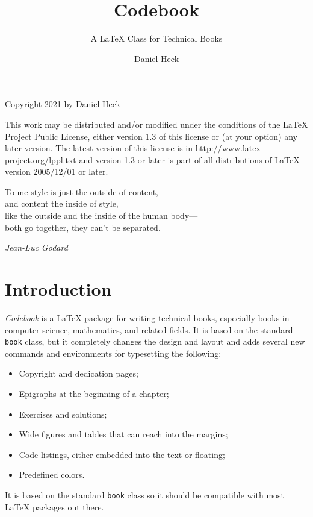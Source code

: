 \documentclass[minted]{codebook}
\begin{document}
\frontmatter

\author{Daniel Heck}
\title{Codebook}
\subtitle{A LaTeX Class for Technical Books}

\maketitle

\begin{copyrightpage}
Copyright \textcopyright{} 2021 by Daniel Heck

This work may be distributed and/or modified under the
conditions of the LaTeX Project Public License, either version 1.3
of this license or (at your option) any later version.
The latest version of this license is in
  \url{http://www.latex-project.org/lppl.txt}
and version 1.3 or later is part of all distributions of LaTeX
version 2005/12/01 or later.
\end{copyrightpage}


\begin{dedicationpage}
To me style is just the outside of content,\\
and content the inside of style,\\
like the outside and the inside of the human body---\\
both go together, they can't be separated.\par
\bigskip
\emph{Jean-Luc Godard}
\end{dedicationpage}


\tableofcontents

\chapter{Introduction}

\emph{Codebook} is a \LaTeX{} package for writing technical books,
especially books in computer science, mathematics, and related fields.
It is based on the standard \texttt{book} class, but it completely changes the design and layout and adds several new commands and environments for typesetting the following:
\begin{itemize}
  \item Copyright and dedication pages;
  \item Epigraphs at the beginning of a chapter;
  \item Exercises and solutions;
  \item Wide figures and tables that can reach into the margins;
  \item Code listings, either embedded into the text or floating;
  \item Predefined colors.
\end{itemize}
It is based on the standard \texttt{book} class so it should be compatible with most \LaTeX{} packages out there.
\end{document}
